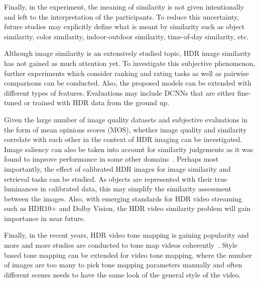 Finally, in the experiment, the meaning of similarity is not given intentionally and left to the interpretation of the participants. To reduce this uncertainty, future studies may explicitly define what is meant by similarity such as object similarity, color similarity, indoor-outdoor similarity, time-of-day similarity, etc.

Although image similarity is an extensively studied topic, HDR image similarity has not gained as much attention yet. To investigate this subjective phenomenon, further experiments which consider ranking and rating tasks as well as pairwise comparisons can be conducted. Also, the proposed models can be extended with different types of features. Evaluations may include DCNNs that are either fine-tuned or trained with HDR data from the ground up.

Given the large number of image quality datasets and subjective evaluations in the form of mean opinions scores (MOS), whether image quality and similarity correlate with each other in the context of HDR imaging can be investigated. Image saliency can also be taken into account for similarity judgements as it was found to improve performance in some other domains~\cite{amirkhani2019inpainted}. Perhaps most importantly, the effect of calibrated HDR images for image similarity and retrieval tasks can be studied. As objects are represented with their true luminances in calibrated data, this may simplify the similarity assessment between the images. Also, with emerging standards for HDR video streaming such as HDR10+ and Dolby Vision, the HDR video similarity problem will gain importance in near future.

Finally, in the recent years, HDR video tone mapping is gaining popularity and more and more studies are conducted to tone map videos coherently~\cite{eilertsen2017comparative}. Style based tone mapping can be extended for video tone mapping, where the number of images are too many to pick tone mapping parameters manually and often different scenes needs to have the same look of the general style of the video. 
